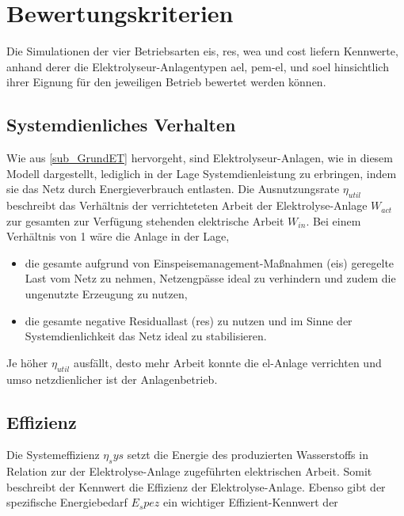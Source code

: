 \documentclass[onecolumn,10pt,titlepage]{article}
\begin{document}
\section{Bewertungskriterien}
\label{Bewertungs-Krit}

Die Simulationen der vier Betriebsarten \gls{eis}, \gls{res}, \gls{wea} und \gls{cost}  liefern Kennwerte, anhand derer die Elektrolyseur-Anlagentypen \gls{ael}, \gls{pem}-\gls{el}, und \gls{soel} 
hinsichtlich ihrer Eignung für den jeweiligen Betrieb bewertet werden können.

\subsection{ Systemdienliches Verhalten}%

Wie aus \ref{sub_GrundET} hervorgeht, sind Elektrolyseur-Anlagen, wie in diesem Modell dargestellt, lediglich in der Lage  Systemdienleistung zu erbringen, indem sie das Netz durch Energieverbrauch entlasten. Die  Ausnutzungsrate $\eta_{util}$ beschreibt das Verhältnis der verrichteteten Arbeit der Elektrolyse-Anlage $W_{act}$ zur gesamten zur Verfügung stehenden elektrische Arbeit $W_{in}$.
Bei einem Verhältnis von 1 wäre die Anlage in der Lage,
\begin{itemize}
\item die gesamte aufgrund von Einspeisemanagement-Maßnahmen (\gls{eis}) geregelte Last vom Netz zu nehmen, Netzengpässe ideal zu verhindern und zudem die ungenutzte Erzeugung zu nutzen,
\item die gesamte negative Residuallast (\gls{res}) zu nutzen und im Sinne der Systemdienlichkeit das Netz ideal zu stabilisieren.
\end{itemize}
Je höher $\eta_{util}$ ausfällt, desto mehr Arbeit konnte die \gls{el}-Anlage verrichten und umso netzdienlicher ist der Anlagenbetrieb.

\subsection{Effizienz}
Die Systemeffizienz $\eta_sys$ setzt die Energie des produzierten Wasserstoffs in Relation zur der Elektrolyse-Anlage zugeführten elektrischen Arbeit. Somit beschreibt der Kennwert die Effizienz der Elektrolyse-Anlage. %
Ebenso gibt der spezifische Energiebedarf $E_spez$ ein wichtiger Effizient-Kennwert der

%
%
\end{document}

